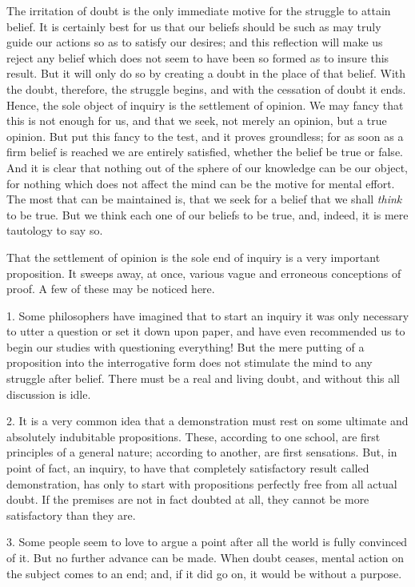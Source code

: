 The irritation of doubt is the only immediate motive for the struggle
to attain belief. It is certainly best for us that our beliefs should
be such as may truly guide our actions so as to satisfy our desires;
and this reflection will make us reject any belief which does not seem
to have been so formed as to insure this result. But it will only do
so by creating a doubt in the place of that belief. With the doubt,
therefore, the struggle begins, and with the cessation of doubt it
ends. Hence, the sole object of inquiry is the settlement of opinion.
We may fancy that this is not enough for us, and that we seek, not
merely an opinion, but a true opinion. But put this fancy to the
test, and it proves groundless; for as soon as a firm belief is
reached we are entirely satisfied, whether the belief be true or
false. And it is clear that nothing out of the sphere of our knowledge
can be our object, for nothing which does not affect the mind can be
the motive for mental effort. The most that can be maintained is, that
we seek for a belief that we shall \textit{think} to be true. But we
think each one of our beliefs to be true, and, indeed, it is mere
tautology to say so.

That the settlement of opinion is the sole end of inquiry is a very
important proposition. It sweeps away, at once, various vague and
erroneous conceptions of proof. A few of these may be noticed here.

1. Some philosophers have imagined that to start an inquiry it was
only necessary to utter a question or set it down upon paper, and have
even recommended us to begin our studies with questioning everything!
But the mere putting of a proposition into the interrogative form does
not stimulate the mind to any struggle after belief. There must be a
real and living doubt, and without this all discussion is idle.

2. It is a very common idea that a demonstration must rest on some
ultimate and absolutely indubitable propositions. These, according to
one school, are first principles of a general nature; according to
another, are first sensations. But, in point of fact, an inquiry,
 to have that completely satisfactory result called
demonstration, has only to start with propositions perfectly free from
all actual doubt. If the premises are not in fact doubted at all, they
cannot be more satisfactory than they are.

3. Some people seem to love to argue a point after all the world is
fully convinced of it. But no further advance can be made. When doubt
ceases, mental action on the subject comes to an end; and, if it did
go on, it would be without a purpose.

